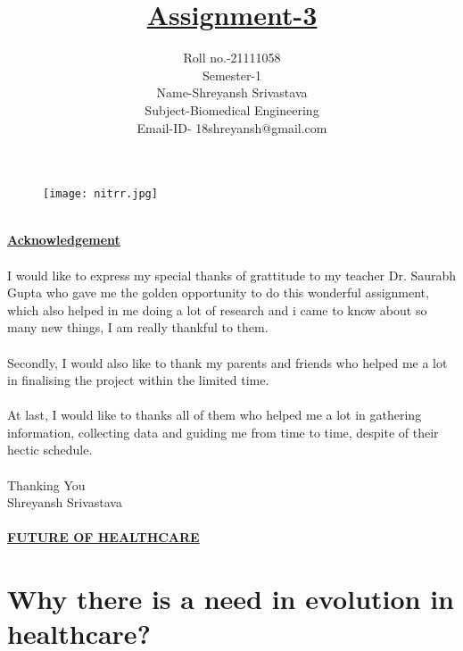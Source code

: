 \documentclass[12pt]{article}
\title{\textbf{\underline{Assignment-3}}}
\date{Roll no.-21111058\\Semester-1\\\Large {Name-Shreyansh Srivastava}\\Subject-Biomedical Engineering\\Email-ID- 18shreyansh@gmail.com}
\begin{document}
	\maketitle
	\begin{figure}[h]
		\centering
		\texttt{[image: nitrr.jpg]}
	\end{figure}
    \clearpage
    \begin{Acknowledgement}
    	\\\Huge{\textbf{\underline{Acknowledgement}}}\\
    	\\\large I would like to express my special thanks of grattitude to my teacher Dr. Saurabh Gupta who gave me the golden opportunity to do this wonderful assignment, which also helped in me doing a lot of research and i came to know about so many new things, I am really thankful to them.\\\\
    	Secondly, I would also like to thank my parents and friends who helped me a lot in finalising the project within the limited time.\\\\
    	At last, I would like to thanks all of them who helped me a lot in gathering information, collecting data and guiding me from time to time, despite of their hectic schedule.\\\\
    	Thanking You\\
    	Shreyansh Srivastava
    \end{Acknowledgement}
    \clearpage
    \paragraph{\textbf{\underline{\Large FUTURE OF HEALTHCARE}}}
    
    
    
    \section{\textbf{Why there is a need in evolution in healthcare?}}
\end{document}
